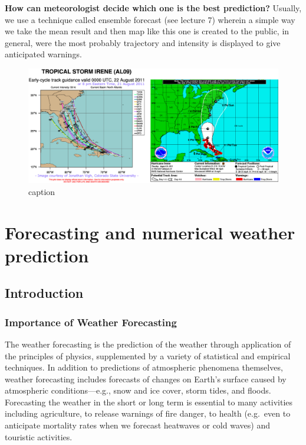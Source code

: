 \documentclass[12pt,oneside]{book}
\begin{document}
\textbf{How can meteorologist decide which one is the best prediction?}
Usually, we use a technique called ensemble forecast (see lecture 7)
wherein a simple way we take the mean result and then map like this one
is created to the public, in general, were the most probably trajectory
and intensity is displayed to give anticipated warnings.

\begin{figure}

{\centering \includegraphics[width=0.8\linewidth]{figures/FigureE16} 

}

\caption{caption}\label{fig:TrackingandForecasting}
\end{figure}

\chapter{Forecasting and numerical weather prediction}\label{introFore}


\section{Introduction}\label{introduction}

\subsection{Importance of Weather
Forecasting}\label{importance-of-weather-forecasting}

The weather forecasting is the prediction of the weather through
application of the principles of physics, supplemented by a variety of
statistical and empirical techniques. In addition to predictions of
atmospheric phenomena themselves, weather forecasting includes forecasts
of changes on Earth's surface caused by atmospheric conditions---e.g.,
snow and ice cover, storm tides, and floods. Forecasting the weather in
the short or long term is essential to many activities including
agriculture, to release warnings of fire danger, to health (e.g.~even to
anticipate mortality rates when we forecast heatwaves or cold waves) and
touristic activities.
\end{document}
